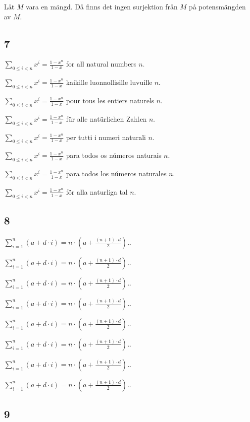 \documentclass{article}
\newcommand{\sumgeom}[2]{\sum_{0 \leq i < #2} {#1}^i}
\newcommand{\sumarith}[3]{\sum_{i = 1}^{#3}(#1 + #2 \cdot i)}
\begin{document}
Låt $ M $ vara en mängd. Då finns det ingen surjektion från $ M $ på potensmängden av $ M $.

\subsection*{7}

$ \sumgeom{x}{n} = \frac{1 - x^{n}}{1 - x} $ for all natural numbers $ n $.

$ \sumgeom{x}{n} = \frac{1 - x^{n}}{1 - x} $ kaikille luonnollisille luvuille $ n $.

$ \sumgeom{x}{n} = \frac{1 - x^{n}}{1 - x} $ pour tous les entiers naturels $ n $.

$ \sumgeom{x}{n} = \frac{1 - x^{n}}{1 - x} $ für alle natürlichen Zahlen $ n $.

$ \sumgeom{x}{n} = \frac{1 - x^{n}}{1 - x} $ per tutti i numeri naturali $ n $.

$ \sumgeom{x}{n} = \frac{1 - x^{n}}{1 - x} $ para todos os números naturais $ n $.

$ \sumgeom{x}{n} = \frac{1 - x^{n}}{1 - x} $ para todos los números naturales $ n $.

$ \sumgeom{x}{n} = \frac{1 - x^{n}}{1 - x} $ för alla naturliga tal $ n $.

\subsection*{8}

$ \sumarith{a}{d}{n} = n \cdot ( a + \frac{(n + 1) \cdot d}{2}). $.

$ \sumarith{a}{d}{n} = n \cdot ( a + \frac{(n + 1) \cdot d}{2}). $.

$ \sumarith{a}{d}{n} = n \cdot ( a + \frac{(n + 1) \cdot d}{2}). $.

$ \sumarith{a}{d}{n} = n \cdot ( a + \frac{(n + 1) \cdot d}{2}). $.

$ \sumarith{a}{d}{n} = n \cdot ( a + \frac{(n + 1) \cdot d}{2}). $.

$ \sumarith{a}{d}{n} = n \cdot ( a + \frac{(n + 1) \cdot d}{2}). $.

$ \sumarith{a}{d}{n} = n \cdot ( a + \frac{(n + 1) \cdot d}{2}). $.

$ \sumarith{a}{d}{n} = n \cdot ( a + \frac{(n + 1) \cdot d}{2}). $.

\subsection*{9}
\end{document}

